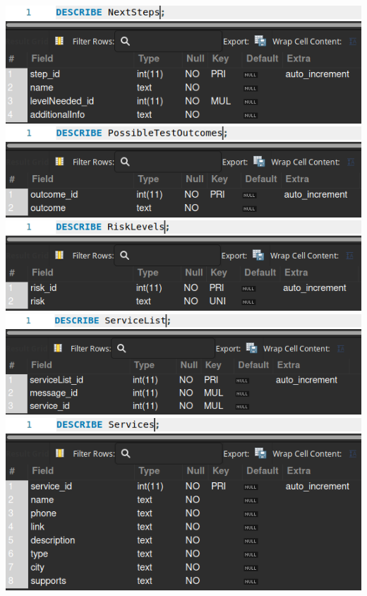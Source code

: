 \documentclass[
]{article}
\begin{document}
\includegraphics{imgs/Describe_NextSteps.png}\\
\includegraphics{imgs/Describe_PossTestOutcomes.png}\\
\includegraphics{imgs/Describe_RiskLevels.png}\\
\includegraphics{imgs/Describe_ServiceList.png}\\
\includegraphics{imgs/Describe_Services.png}\\
\end{document}
